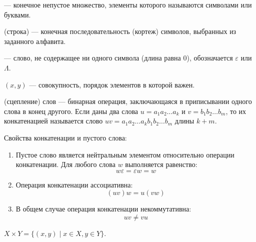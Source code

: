 \begin{definition}
     --- конечное непустое множество, элементы которого
    называются символами или буквами.
\end{definition}

\begin{definition}
     (строка) --- конечная последовательность (кортеж)
    символов, выбранных из заданного алфавита.
\end{definition}

\begin{definition}
     --- слово, не содержащее ни одного символа
    (длина равна 0), обозначается \(\varepsilon\) или \(\Lambda\).
\end{definition}

\begin{definition}
     \((x, y)\) --- совокупность, порядок элементов
    в которой важен.
\end{definition}

\begin{definition}
     (сцепление) слов --- бинарная операция, заключающаяся
    в приписывании одного слова в конец другого. Если даны два
    слова \(u = a_1 a_2 \dots a_k\) и \(v = b_1 b_2 \dots b_m\), то их конкатенацией
    называется слово \(uv = a_1 a_2 \dots a_k b_1 b_2 \dots b_m\) длины \(k + m\).
\end{definition}

\begin{remark}
    Свойства конкатенации и пустого слова:
    \begin{enumerate}
        \item Пустое слово является нейтральным элементом относительно
        операции конкатенации. Для любого слова \(w\) выполняется равенство: 
        \[w \varepsilon = \varepsilon w = w\]
        \item Операция конкатенации ассоциативна: 
        \[(uv)w = u(vw)\]
        \item В общем случае операция конкатенации некоммутативна: 
        \[uv \neq vu\]
    \end{enumerate}
\end{remark}

\begin{definition}
     \(X \times Y = \{(x, y) \mid x \in X, y \in Y\}\).
\end{definition}

